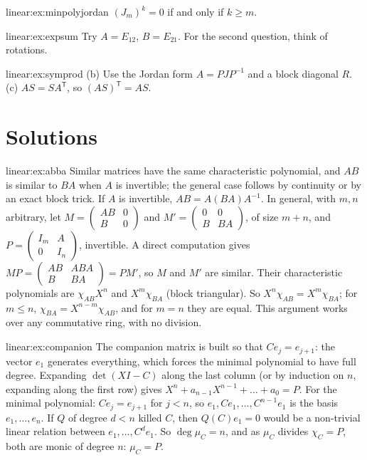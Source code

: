 \begin{hint}{linear:ex:minpolyjordan}
$(J_m)^{k}=0$ if and only if $k\ge m$.
\end{hint}
\begin{hint}{linear:ex:expsum}
Try $A=E_{12}$, $B=E_{21}$. For the second question, think of rotations.
\end{hint}
\begin{hint}{linear:ex:symprod}
(b) Use the Jordan form $A=PJP^{-1}$ and a block diagonal $R$. (c) $AS=SA^{\mathsf T}$, so $(AS)^{\mathsf T}=AS$.
\end{hint}

\section{Solutions}

\begin{solution}{linear:ex:abba}
\idea Similar matrices have the same characteristic polynomial, and $AB$ is similar to $BA$ when $A$ is invertible; the
general case follows by continuity or by an exact block trick.
\writeup If $A$ is invertible, $AB=A(BA)A^{-1}$. In general, with $m,n$ arbitrary, let $M=\begin{pmatrix}AB&0\\B&0\end{pmatrix}$ and
$M'=\begin{pmatrix}0&0\\B&BA\end{pmatrix}$, of size $m+n$, and $P=\begin{pmatrix}I_m&A\\0&I_n\end{pmatrix}$, invertible. A direct computation gives
$MP=\begin{pmatrix}AB&ABA\\B&BA\end{pmatrix}=PM'$, so $M$ and $M'$ are similar. Their characteristic polynomials are
$\chi_{AB}X^n$ and $X^m\chi_{BA}$ (block triangular). So $X^n\chi_{AB}=X^m\chi_{BA}$; for $m\le n$, $\chi_{BA}=X^{n-m}\chi_{AB}$, and for
$m=n$ they are equal. This argument works over any commutative ring, with no division.
\end{solution}

\begin{solution}{linear:ex:companion}
\idea The companion matrix is built so that $Ce_j=e_{j+1}$: the vector $e_1$ generates everything, which forces the
minimal polynomial to have full degree.
\writeup Expanding $\det(XI-C)$ along the last column (or by induction on $n$, expanding along the first row) gives
$X^n+a_{n-1}X^{n-1}+\dots+a_0=P$. For the minimal polynomial: $Ce_j=e_{j+1}$ for $j<n$, so $e_1,Ce_1,\dots,C^{n-1}e_1$ is the basis
$e_1,\dots,e_n$. If $Q$ of degree $d<n$ killed $C$, then $Q(C)e_1=0$ would be a non-trivial linear relation between
$e_1,\dots,C^de_1$. So $\deg\mu_C=n$, and as $\mu_C$ divides $\chi_C=P$, both are monic of degree $n$: $\mu_C=P$.
\end{solution}

